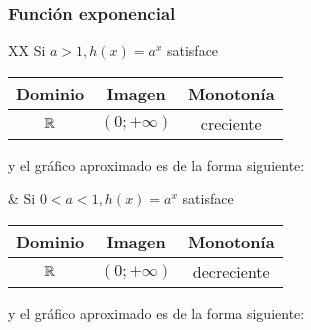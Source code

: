 \documentclass[../Teoría.root.tex]{subfiles}
\begin{document}
\subsubsection{Función exponencial}
\begin{tabularx}{\textwidth}{XX}
    Si \(a>1, h(x)=a^x\) satisface
    \begin{center}
        \begin{tabular}{|c|c|c|}
            \hline
            Dominio & Imagen          & Monotonía \\\hline
            \(\mathbb{R}\)  & \((0;+\infty)\) & creciente \\
            \hline
        \end{tabular}
    \end{center}
    y el gráfico aproximado es de la forma siguiente:
    \begin{center}
    \end{center}
     &
    Si \(0<a<1, h(x)=a^x\) satisface
    \begin{center}
        \begin{tabular}{|c|c|c|}
            \hline
            Dominio & Imagen          & Monotonía   \\\hline
            \(\mathbb{R}\)  & \((0;+\infty)\) & decreciente \\
            \hline
        \end{tabular}
    \end{center}
    y el gráfico aproximado es de la forma siguiente:
    \begin{center}
    \end{center}
\end{tabularx}
\end{document}

